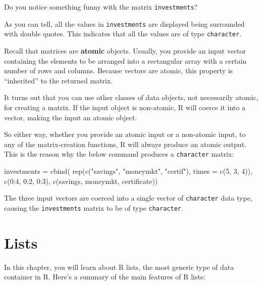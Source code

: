 \documentclass[
]{book}
\newenvironment{Shaded}{\begin{snugshade}}{\end{snugshade}}
\newcommand{\AttributeTok}[1]{\textcolor[rgb]{0.77,0.63,0.00}{#1}}
\newcommand{\DecValTok}[1]{\textcolor[rgb]{0.00,0.00,0.81}{#1}}
\newcommand{\FunctionTok}[1]{\textcolor[rgb]{0.00,0.00,0.00}{#1}}
\newcommand{\NormalTok}[1]{#1}
\newcommand{\OtherTok}[1]{\textcolor[rgb]{0.56,0.35,0.01}{#1}}
\newcommand{\SpecialCharTok}[1]{\textcolor[rgb]{0.00,0.00,0.00}{#1}}
\newcommand{\StringTok}[1]{\textcolor[rgb]{0.31,0.60,0.02}{#1}}
\begin{document}
Do you notice something funny with the matrix \texttt{investments}?

As you can tell, all the values in \texttt{investments} are displayed being surrounded
with double quotes. This indicates that all the values are of type \texttt{character}.

Recall that matrices are \textbf{atomic} objects. Usually, you provide an input
vector containing the elements to be arranged into a rectangular array with
a certain number of rows and columns. Because vectors are atomic, this property
is ``inherited'' to the returned matrix.

It turns out that you can use other classes of data objects, not necessarily
atomic, for creating a matrix. If the input object is non-atomic, R will
coerce it into a vector, making the input an atomic object.

So either way, whether you provide an atomic input or a non-atomic input,
to any of the matrix-creation functions, R will always produce an atomic
output. This is the reason why the below command produces a \texttt{character} matrix:

\begin{Shaded}
\begin{Highlighting}[]
\NormalTok{investments }\OtherTok{=} \FunctionTok{cbind}\NormalTok{(}
  \FunctionTok{rep}\NormalTok{(}\FunctionTok{c}\NormalTok{(}\StringTok{"savings"}\NormalTok{, }\StringTok{"moneymkt"}\NormalTok{, }\StringTok{"certif"}\NormalTok{), }\AttributeTok{times =} \FunctionTok{c}\NormalTok{(}\DecValTok{5}\NormalTok{, }\DecValTok{3}\NormalTok{, }\DecValTok{4}\NormalTok{)),}
  \FunctionTok{c}\NormalTok{(}\DecValTok{0}\SpecialCharTok{:}\DecValTok{4}\NormalTok{, }\DecValTok{0}\SpecialCharTok{:}\DecValTok{2}\NormalTok{, }\DecValTok{0}\SpecialCharTok{:}\DecValTok{3}\NormalTok{), }
  \FunctionTok{c}\NormalTok{(savings, moneymkt, certificate))}
\end{Highlighting}
\end{Shaded}

The three input vectors are coerced into a single vector of \texttt{character} data
type, causing the \texttt{investments} matrix to be of type \texttt{character}.

\hypertarget{lists}{%
\chapter{Lists}\label{lists}}

In this chapter, you will learn about R lists, the most generic type of data
container in R. Here's a summary of the main features of R lists:
\end{document}
